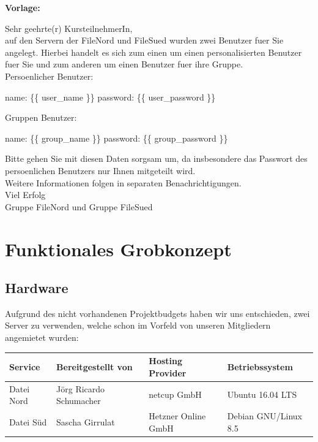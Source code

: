 \textbf{Vorlage:}
\begin{center}
\begin{framedminipage}{0.8\textwidth}
Sehr geehrte(r) KursteilnehmerIn,\\

auf den Servern der FileNord und FileSued wurden zwei Benutzer fuer Sie
angelegt. Hierbei handelt es sich zum einen um einen personalisierten Benutzer
fuer Sie und zum anderen um einen Benutzer fuer ihre Gruppe.\\

Persoenlicher Benutzer:\bigskip

  name: \{\{ user\_name \}\}
  password: \{\{ user\_password \}\}\bigskip

Gruppen Benutzer:\bigskip

  name: \{\{ group\_name \}\}
  password: \{\{ group\_password \}\}\bigskip

Bitte gehen Sie mit diesen Daten sorgsam um, da insbesondere das Passwort des
persoenlichen Benutzers nur Ihnen mitgeteilt wird.\\

Weitere Informationen folgen in separaten Benachrichtigungen.\\

Viel Erfolg\\

Gruppe FileNord und Gruppe FileSued
\end{framedminipage}
\end{center}

\newpage
\section{Funktionales Grobkonzept}

\subsection{Hardware}
\label{subsec:hardware}
Aufgrund des nicht vorhandenen Projektbudgets haben wir uns entschieden, zwei Server zu verwenden, welche schon im Vorfeld von unseren Mitgliedern angemietet wurden:

\begin{minipage}{\textwidth}
\begin{center}
\begin{tabular}{llll}
\toprule
Service & Bereitgestellt von & Hosting Provider & Betriebssystem \\
\midrule
Datei Nord & Jörg Ricardo Schumacher & netcup GmbH & Ubuntu 16.04 LTS \\
Datei Süd & Sascha Girrulat & Hetzner Online GmbH & Debian GNU/Linux 8.5 \\
\bottomrule
\end{tabular}
\end{center}
\end{minipage}\bigskip


